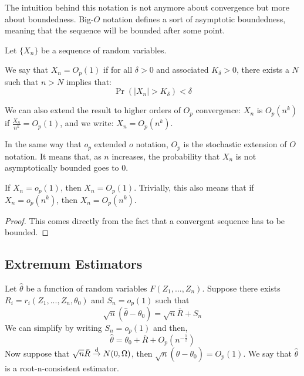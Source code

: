The intuition behind this notation is not anymore about convergence but more about boundedness. Big-$O$ notation defines a sort of asymptotic boundedness, meaning that the sequence will be bounded after some point.

\begin{definition}
Let $\{X_n\}$ be a sequence of random variables. 

We say that $X_n=O_p(1)$ if for all $\delta >0$ and associated $K_{\delta}>0$, there exists a $N$ such that $n>N$ implies that: $$\operatorname{Pr}(\lvert X_n\rvert > K_{\delta})<\delta$$

We can also extend the result to higher orders of $O_p$ convergence: $X_n$ is $O_p(n^k)$ if $\frac{X_n}{n^k}=O_p(1)$, and we write: $X_n = O_p(n^k)$.
\end{definition}

In the same way that $o_p$ extended $o$ notation, $O_p$ is the stochastic extension of $O$ notation. It means that, as $n$ increases, the probability that $X_n$ is not asymptotically bounded goes to 0.

\begin{proposition}
If $X_n = o_p(1)$, then $X_n = O_p(1)$. Trivially, this also means that if $X_n = o_p(n^k)$, then $X_n = O_p(n^k)$.
\end{proposition}

\begin{proof}
This comes directly from the fact that a convergent sequence has to be bounded.
\end{proof}

\subsection{Extremum Estimators}

\begin{definition}
Let $\hat\theta$ be a function of random variables $F(Z_1, ..., Z_n)$. Suppose there exists $R_i = r_i(Z_1, ..., Z_n, \theta_0)$ and $S_n = o_p(1)$ such that $$\sqrt{n}(\hat\theta - \theta_0) = \sqrt{n}\bar R + S_n $$We can simplify by writing $S_n = o_p(1)$ and then, $$\hat\theta = \theta_0 + \bar R + O_p(n^{-\frac{1}{2}}) $$Now suppose that $\sqrt{n}\bar R\overset{\text{d}}{\to} N(0, \Omega)$, then $\sqrt{n}(\hat\theta - \theta_0) = O_p(1)$. We say that $\hat\theta$ is a root-n-consistent estimator.
\end{definition}


